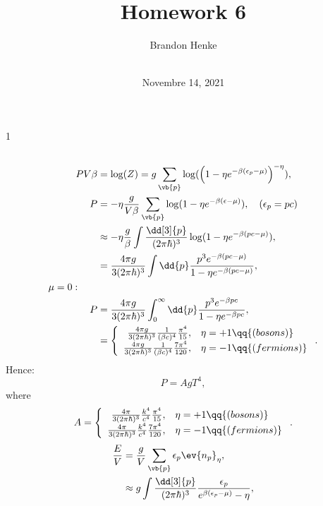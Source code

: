 \documentclass[a4paper,12pt,twoside]{article}
\title{Homework 6}
\author{
	Brandon Henke\\
	\textit{\course}\\
	\textit{\professor}
}
\date{Novembre 14, 2021}
\newcommand{\mcols}{0}
\begin{document}

\maketitle
\if\mcols1
\begin{multicols*}{2}
\fi

\setcounter{section}{6}
\subsection{}
\begin{align}
	PV\beta &= \log(Z) = g\sum_{\vb{p}}\log(\left(1-\eta e^{-\beta(\epsilon_p-\mu)}\right)^{-\eta}),\\
	P &= -\eta \frac{g}{V\beta} \sum_{\vb{p}} \log(1-\eta e^{-\beta(\epsilon-\mu)}), \quad (\epsilon_p = pc)\\
	&\approx -\eta \frac{g}{\beta} \int \frac{\dd[3]{p}}{(2\pi\hbar)^3} \log(1-\eta e^{-\beta(pc-\mu)}),\\
	&= \frac{4\pi g}{3(2\pi\hbar)^3} \int \dd{p}\frac{p^3 e^{-\beta(pc-\mu)}}{1-\eta e^{-\beta(pc-\mu)}},\\
	\mu = 0:\qquad&\\
	P &= \frac{4\pi g}{3(2\pi\hbar)^3} \int_0^\infty \dd{p}\frac{p^3 e^{-\beta pc}}{1-\eta e^{-\beta pc}},\\
	&= \left\{
		\begin{array}{rl}
			\frac{4\pi g}{3(2\pi\hbar)^3} \frac{1}{(\beta c)^4} \frac{\pi^4}{15}, & \eta = +1 \qq{(bosons)}\\
			\frac{4\pi g}{3(2\pi\hbar)^3} \frac{1}{(\beta c)^4} \frac{7\pi^4}{120}, & \eta = -1 \qq{(fermions)}
		\end{array}
	\right..
\end{align}
Hence:
\begin{equation}
	P = A g T^4,
\end{equation}
where
\begin{equation}
	A = \left\{
		\begin{array}{rl}
			\frac{4\pi}{3(2\pi\hbar)^3} \frac{k^4}{c^4} \frac{\pi^4}{15}, & \eta = +1 \qq{(bosons)}\\
			\frac{4\pi}{3(2\pi\hbar)^3} \frac{k^4}{c^4} \frac{7\pi^4}{120}, & \eta = -1 \qq{(fermions)}
		\end{array}
	\right..
\end{equation}\begin{align}
	\frac{E}{V} &= \frac{g}{V}\sum_{\vb{p}} \epsilon_p \ev{n_p}_\eta,\\
	&\approx g \int \frac{\dd[3]{p}}{(2\pi\hbar)^3} \frac{\epsilon_p}{e^{\beta(\epsilon_p-\mu)}-\eta},\\

\end{align}
\end{multicols*}
\end{document}
